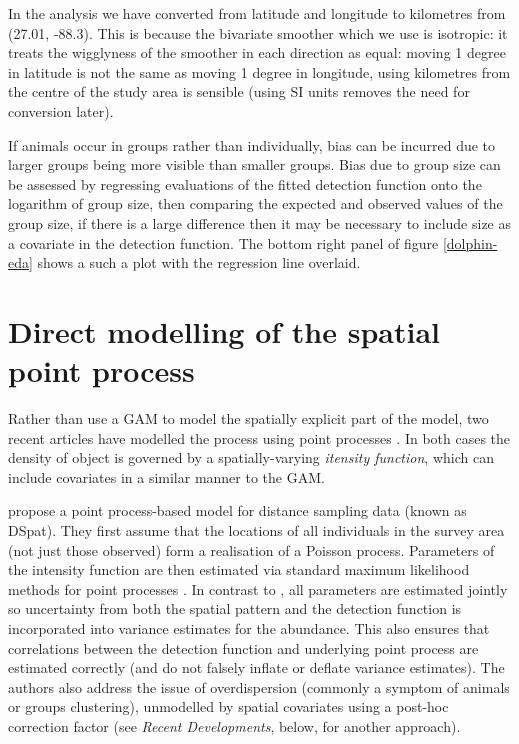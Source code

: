 \documentclass[a4paper,12pt]{article}
\begin{document}
In the analysis we have converted from latitude and longitude to kilometres from (27.01, -88.3). This is because the bivariate smoother which we use \citep[the thin plate spline;][]{Wood:2003tc} is isotropic: it treats the wigglyness of the smoother in each direction as equal: moving 1 degree in latitude is not the same as moving 1 degree in longitude, using kilometres from the centre of the study area is sensible (using SI units removes the need for conversion later). 

If animals occur in groups rather than individually, bias can be incurred due to larger groups being more visible than smaller groups. Bias due to group size can be assessed by regressing evaluations of the fitted detection function onto the logarithm of group size, then comparing the expected and observed values of the group size, if there is a large difference then it may be necessary to include size as a covariate in the detection function. The bottom right panel of figure \ref{dolphin-eda} shows a such a plot with the regression line overlaid.


\section*{Direct modelling of the spatial point process}
\label{s:direct}

Rather than use a GAM to model the spatially explicit part of the model, two recent articles have modelled the process using point processes \citep{cox1980point}. In both cases the density of object is governed by a spatially-varying \textit{itensity function}, which can include covariates in a similar manner to the GAM.

\cite{Johnson:2010gf} propose a point process-based model for distance sampling data (known as DSpat). They first assume that the locations of all individuals in the survey area (not just those observed) form a realisation of a Poisson process. Parameters of the intensity function are then estimated via standard maximum likelihood methods for point processes \citep{Baddeley:2000to}. In contrast to \cite{Hedley:2004et}, all parameters are estimated jointly so uncertainty from both the spatial pattern and the detection function is incorporated into variance estimates for the abundance. This also ensures that correlations between the detection function and underlying point process are estimated correctly (and do not falsely inflate or deflate variance estimates). The authors also address the issue of overdispersion (commonly a symptom of animals or groups clustering), unmodelled by spatial covariates using a post-hoc correction factor (see \textit{Recent Developments}, below, for another approach). 
\end{document}
